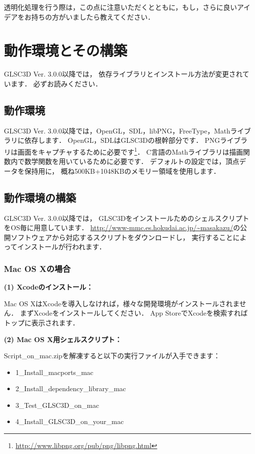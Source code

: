 \documentclass[platex,a4paper,12pt]{jsarticle}%
\begin{document}
透明化処理を行う際は，この点に注意いただくとともに，もし，さらに良いアイデアをお持ちの方がいましたら教えてください．

\newpage
\section{動作環境とその構築}
GLSC3D Ver. 3.0.0以降では，
依存ライブラリとインストール方法が変更されています．
必ずお読みください．

\subsection{動作環境}
GLSC3D Ver. 3.0.0以降では，OpenGL，SDL，libPNG，FreeType，Mathライブラリに依存します．
OpenGL，SDLはGLSC3Dの根幹部分です．
PNGライブラリは画面をキャプチャするために必要です\footnote{\url{http://www.libpng.org/pub/png/libpng.html}}．
C言語のMathライブラリは描画関数内で数学関数を用いているために必要です．
デフォルトの設定では，頂点データを保持用に，
概ね500KB+1048KBのメモリー領域を使用します．


\subsection{動作環境の構築}
GLSC3D Ver. 3.0.0以降では，
GLSC3DをインストールためのシェルスクリプトをOS毎に用意しています．
\url{http://www-mmc.es.hokudai.ac.jp/~masakazu/}の公開ソフトウェアから対応するスクリプトをダウンロードし，
実行することによってインストールが行われます．

\subsubsection{Mac OS Xの場合}

\noindent
{\bf (1) Xcodeのインストール：}

Mac OS XはXcodeを導入しなければ，様々な開発環境がインストールされません．
まずXcodeをインストールしてください．
App StoreでXcodeを検索すればトップに表示されます．

\noindent 
{\bf (2) Mac OS X用シェルスクリプト：} 

Script\_on\_mac.zipを解凍すると以下の実行ファイルが入手できます：
\begin{itemize}
\item[] 1\_Install\_macports\_mac
\item[] 2\_Install\_dependency\_library\_mac
\item[] 3\_Test\_GLSC3D\_on\_mac
\item[] 4\_Install\_GLSC3D\_on\_your\_mac
\end{itemize}
\end{document}
